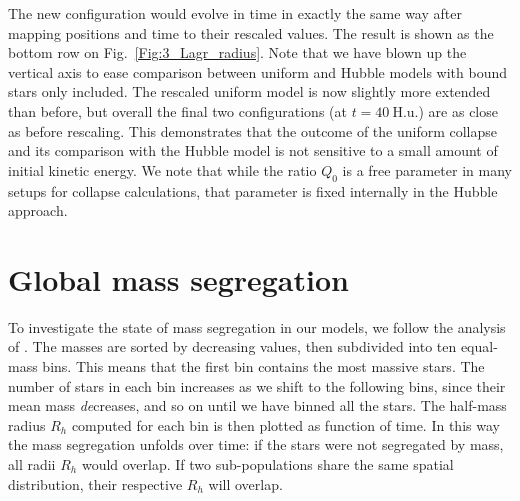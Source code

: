   The new configuration would evolve in time in exactly the same way after mapping positions and time to their rescaled values. The result is shown as the bottom row on Fig.~\ref{Fig:3_Lagr_radius}.  Note that we  have blown up the vertical axis to ease comparison between uniform and Hubble models with bound stars only included. The rescaled uniform model is now slightly more extended than before, but overall the final two configurations (at $t = 40~$H.u.) are as close as before rescaling. This demonstrates that  the outcome of the uniform collapse and its comparison with the Hubble model is not sensitive to a small amount of initial kinetic energy. We note that while the ratio $Q_0$ is a free parameter in many setups for collapse calculations, that parameter is fixed internally in the Hubble approach. 










\section{Global mass segregation}
\label{Sec:Segregation} 


To investigate the state of mass segregation in our models, we follow the analysis of \cite{Caputo2014}. The masses are sorted by decreasing values, then subdivided into ten equal-mass bins. This means that the first bin contains the most massive stars. The number of stars in each bin increases as we shift to the following bins, since their mean mass {\it de}creases, and so on until we have binned all the stars. The half-mass radius $R_h$ computed for each bin is then plotted as function of time. In this way the mass segregation unfolds over time: if the stars were not segregated by mass, all radii $R_h$ would overlap. If two sub-populations share the same spatial distribution, their respective $R_h$ will overlap.


